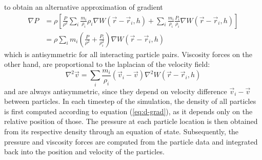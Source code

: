 \documentclass{llncs}
\begin{document}
to obtain an alternative approximation of gradient
\begin{align}
  \label{eq:grad-est}
  \nabla P & = \rho \left[ \frac{P}{\rho^2} \sum_i \frac{m_i}{\rho_i} \rho_i \nabla
             W(\vec{r}-\vec{r}_i, h)
             +
             \sum_i \frac{m_i}{\rho_i} \frac{P_i}{\rho_i} \nabla W(\vec{r}-\vec{r}_i, h)
             \right] \nonumber \\
           & = \rho \sum_i m_i \left(\frac{P}{\rho^2} + \frac{P_i}{\rho_i^2} \right)
             \nabla W(\vec{r}-\vec{r}_i, h)
\end{align}
which is antisymmetric for all interacting particle pairs. Viscosity forces on the other
hand, are proportional to the laplacian of the velocity field:
\begin{equation}
  \label{eq:lapl-est}
  \nabla^2\vec{v} = \sum_i \frac{m_i}{\rho_i} (\vec{v}_i - \vec{v}) \nabla^2
  W(\vec{r}-\vec{r}_i, h)
\end{equation}
and are always antisymmetric, since they depend on velocity difference
$\vec{v}_i - \vec{v}$ between particles.  In each timestep of the simulation, the density
of all particles is first computed according to equation (\ref{eq:d-grad}), as it depends
only on the relative position of those. The pressure at each particle location is then
obtained from its respective density through an equation of state. Subsequently, the
pressure and viscosity forces are computed from the particle data and integrated back into
the position and velocity of the particles.
\end{document}
